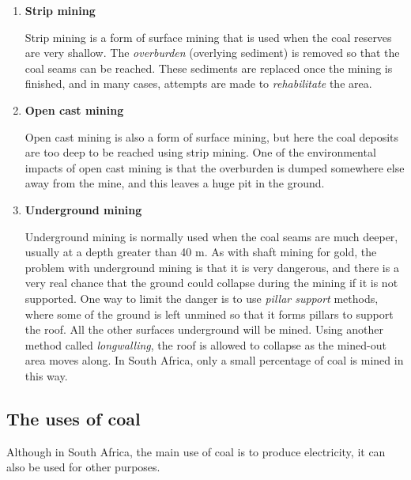 \begin{enumerate}
\item{\textbf{Strip mining}

Strip mining is a form of surface mining that is used when the coal reserves are very shallow. The \textit{overburden} (overlying sediment) is removed so that the coal seams can be reached. These sediments are replaced once the mining is finished, and in many cases, attempts are made to \textit{rehabilitate} the area.
}

\item{\textbf{Open cast mining}

Open cast mining is also a form of surface mining, but here the coal deposits are too deep to be reached using strip mining. One of the environmental impacts of open cast mining is that the overburden is dumped somewhere else away from the mine, and this leaves a huge pit in the ground.
}

\item{\textbf{Underground mining}

Underground mining is normally used when the coal seams are much deeper, usually at a depth greater than 40 m. As with shaft mining for gold, the problem with underground mining is that it is very dangerous, and there is a very real chance that the ground could collapse during the mining if it is not supported. One way to limit the danger is to use \textit{pillar support} methods, where some of the ground is left unmined so that it forms pillars to support the roof. All the other surfaces underground will be mined. Using another method called \textit{longwalling}, the roof is allowed to collapse as the mined-out area moves along. In South Africa, only a small percentage of coal is mined in this way.
}
\end{enumerate}

\subsection{The uses of coal}

Although in South Africa, the main use of coal is to produce electricity, it can also be used for other purposes.

